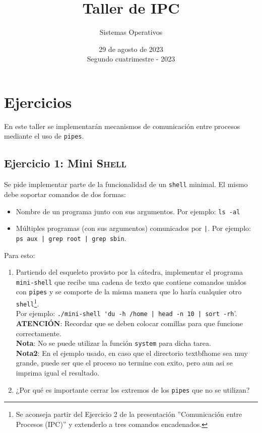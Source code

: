 \documentclass[11pt]{article}
\title{Taller de IPC}
\author{Sistemas Operativos}
\date{
    29 de agosto de 2023\\ \vspace{.3em}
    {\small Segundo cuatrimestre - 2023}
}
\begin{document}
\maketitle

\section{Ejercicios}

En este taller se implementarán mecanismos de comunicación entre procesos mediante el uso de \texttt{pipes}.

\subsection{Ejercicio 1: Mini \textsc{Shell}}

Se pide implementar parte de la funcionalidad de un \texttt{shell} minimal. El mismo debe soportar comandos de dos formas:
\begin{itemize}
	\item Nombre de un programa junto con sus argumentos. Por ejemplo: \texttt{ls -al} 
	\item Múltiples programas (con sus argumentos) comunicados por \texttt{|}. Por ejemplo: \texttt{ps aux | grep root | grep sbin}.
\end{itemize}



Para esto:
\begin{enumerate}[label=\alph*)]
	\item Partiendo del esqueleto provisto por la cátedra, implementar el programa \texttt{mini-shell} que recibe una cadena de texto que contiene comandos unidos con \texttt{pipes} y se comporte de la misma manera que lo haría cualquier otro \texttt{shell}\footnote{Se aconseja partir del Ejercicio 2 de la presentación ''Comunicación entre Procesos (IPC)'' y extenderlo a tres comandos encadenados.}. 
	\\ Por ejemplo: \verb#./mini-shell 'du -h /home | head -n 10 | sort -rh#'. 
	\\ \textbf{ATENCIÓN}: Recordar que se deben colocar comillas para que funcione correctamente.
	\\ \textbf{Nota}: No se puede utilizar la función \texttt{system} para dicha tarea.
	\\ \textbf{Nota2}: En el ejemplo usado, en caso que el directorio textbf{home} sea muy grande, puede ser que el proceso no termine con exito, pero aun asi se imprima igual el resultado.
	\item ¿Por qué es importante cerrar los extremos de los \texttt{pipes} que no se utilizan?
\end{enumerate}
\end{document}

